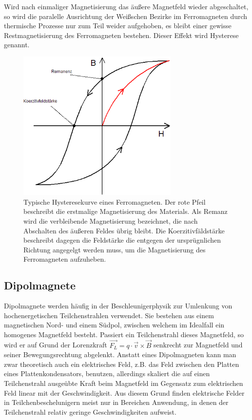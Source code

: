 \documentclass[bigchapter,colorback,accentcolor=tud4b,linedtoc,11pt]{tudreport}
\begin{document}
Wird nach einmaliger Magnetisierung das äußere Magnetfeld wieder abgeschaltet, so wird die paralelle Ausrichtung der Weißschen Bezirke im Ferromagneten durch thermische Prozesse nur zum Teil weider aufgehoben, es bleibt einer gewisse Restmagnetisierung des Ferromagneten bestehen. Dieser Effekt wird Hysterese genannt.

\begin{figure}[H]
\centering
\includegraphics[width=80mm]{img/hysterese.png}
\caption{Typische Hysteresekurve eines Ferromagneten. Der rote Pfeil beschreibt die erstmalige Magnetisierung des Materials. Als Remanz wird die verbleibende Magnetisierung bezeichnet, die nach Abschalten des äußeren Feldes übrig bleibt. Die Koerzitivfäldstärke beschreibt dagegen die Feldstärke die entgegen der ursprügnlichen Richtung angegelgt werden muss, um die Magnetisierung des Ferromagneten aufzuheben.\cite{hysterese}}
\end{figure}

\subsection{Dipolmagnete}

Dipolmagnete werden häufig in der Beschleunigerphysik zur Umlenkung von hochenergetischen Teilchenstrahlen verwendet. Sie bestehen aus einem magnetischen Nord- und einem Südpol, zwischen welchem im Idealfall ein homogenes Magnetfeld besteht. Passiert ein Teilchenstrahl dieses Magnetfeld, so wird er auf Grund der Lorenzkraft $\vec{F_L} = q \cdot \vec{v} \times \vec{B}$ senkrecht zur Magnetfeld und seiner Bewegungsrechtung abgelenkt. Anstatt eines Dipolmagneten kann man zwar theoretisch auch ein elektrisches Feld, z.B. das Feld zwischen den Platten eines Plattenkondensators, benutzen, allerdings skaliert die auf einen Teilchenstrahl ausgeübte Kraft beim Magnetfeld im Gegensatz zum elektrischen Feld linear mit der Geschwindigkeit. Aus diesem Grund finden elektrische Felder in Teilchenbeschelunigern meist nur in Bereichen Anwendung, in denen der Teilchenstrahl relativ geringe Geschwindigkeiten aufweist.
\end{document}
